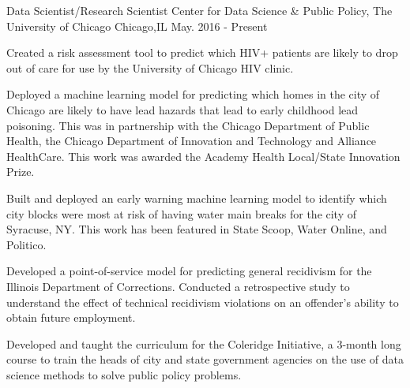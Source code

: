 

\begin{cventries}


  \cventry
    {Data Scientist/Research Scientist} %
    {Center for Data Science \& Public Policy, The University of Chicago} %
    {Chicago,IL} %
    {May. 2016 - Present} %
    {\begin{cvitems}
        \item {Created a risk assessment tool to predict which HIV+ patients are likely to drop out of care for use by the University of Chicago HIV clinic.}
        \item {Deployed a machine learning model for predicting which homes in the city of Chicago are likely to have lead hazards that lead to early childhood lead poisoning. This was in  partnership with the Chicago Department of Public Health, the Chicago Department of Innovation and Technology and Alliance HealthCare. This work was awarded the Academy Health Local/State Innovation Prize.}
         \item {Built and deployed an early warning machine learning model to identify which city blocks were most at risk of having water main breaks for the city of Syracuse, NY. This work has been featured in State Scoop, Water Online, and Politico.}
         \item {Developed a point-of-service model for predicting general recidivism for the Illinois Department of Corrections. Conducted a retrospective study to understand the effect of technical recidivism violations on an offender's ability to obtain future employment.}
         \item{Developed and taught the curriculum for the Coleridge Initiative, a 3-month long course to train the heads of city and state government agencies on the use of data science methods to solve public policy problems.}
     \end{cvitems}}



\end{cventries}
